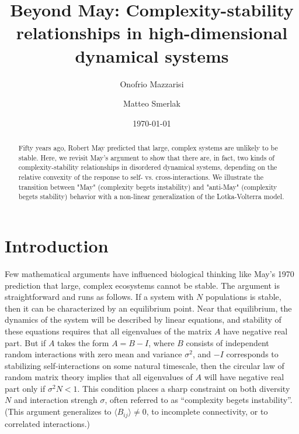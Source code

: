 \documentclass[%
 reprint,
 amsmath,amssymb,
 aps,
]{revtex4-2}
\begin{document}
\title{Beyond May: Complexity-stability relationships in high-dimensional dynamical systems}

\author{Onofrio Mazzarisi}
\author{Matteo Smerlak}



\date{\today}%

\begin{abstract}
Fifty years ago, Robert May predicted that large, complex systems are unlikely to be stable. Here, we revisit May's argument to show that there are, in fact, two kinds of complexity-stability relationships in disordered dynamical systems, depending on the relative convexity of the response to self- vs. cross-interactions. We illustrate the transition between "May" (complexity begets instability) and "anti-May" (complexity begets stability) behavior with a non-linear generalization of the Lotka-Volterra model. 
\end{abstract}

\maketitle

\section{Introduction}

Few mathematical arguments have influenced biological thinking like May's 1970 prediction that large, complex ecosystems cannot be stable. 
The argument is straightforward and runs as follows. 
If a system with $N$ populations is stable, then it can be characterized by an equilibrium point. 
Near that equilibrium, the dynamics of the system will be described by linear equations, and stability of these equations requires that all eigenvalues of the matrix $A$ have negative real part. 
But if $A$ takes the form $A = B - I$, where $B$ consists of independent random interactions with zero mean and variance $\sigma^2$, and $-I$ corresponds to stabilizing self-interactions on some natural timescale, then the circular law of random matrix theory implies that all eigenvalues of $A$ will have negative real part only if $\sigma^2 N < 1$. 
This condition places a sharp constraint on both diversity $N$ and interaction strengh $\sigma$, often referred to as ``complexity begets instability''. 
(This argument generalizes to $\langle B_{ij}\rangle \neq 0$, to incomplete connectivity, or to correlated interactions.)
\end{document}
